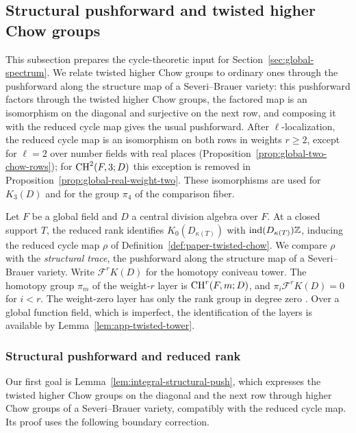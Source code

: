\subsection{Structural pushforward and twisted higher Chow groups}\label{sec:global-chow}
This subsection prepares the cycle-theoretic input for Section~\ref{sec:global-spectrum}.
We relate twisted higher Chow groups to ordinary ones through the pushforward along the structure map of a Severi--Brauer variety: this pushforward factors through the twisted higher Chow groups, the factored map is an isomorphism on the diagonal and surjective on the next row, and composing it with the reduced cycle map gives the usual pushforward.
After $\ell$-localization, the reduced cycle map is an isomorphism on both rows in weights $r\ge2$, except for $\ell=2$ over number fields with real places (Proposition~\ref{prop:global-two-chow-rows}); for $\operatorname{CH}^2(F,3;D)$ this exception is removed in Proposition~\ref{prop:global-real-weight-two}.
These isomorphisms are used for $K_3(D)$ and for the group $\pi_4$ of the comparison fiber.

Let $F$ be a global field and $D$ a central division algebra over $F$.
At a closed support $T$, the reduced rank identifies $K_0(D_{\kappa(T)})$ with $\operatorname{ind}(D_{\kappa(T)})\mathbb Z$, inducing the reduced cycle map $\rho$ of Definition~\ref{def:paper-twisted-chow}.
We compare $\rho$ with the \emph{structural trace}, the pushforward along the structure map of a Severi--Brauer variety.
Write $\mathcal F^rK(D)$ for the homotopy coniveau tower.
The homotopy group $\pi_m$ of the weight-$r$ layer is $\operatorname{CH}^r(F,m;D)$, and $\pi_i\mathcal F^rK(D)=0$ for $i<r$.
The weight-zero layer has only the rank group in degree zero \cite[Corollary 6.1.4 and Section 6.6]{KahnLevine2010}.
Over a global function field, which is imperfect, the identification of the layers is available by Lemma~\ref{lem:app-twisted-tower}.

\subsubsection{Structural pushforward and reduced rank}
Our first goal is Lemma~\ref{lem:integral-structural-push}, which expresses the twisted higher Chow groups on the diagonal and the next row through higher Chow groups of a Severi--Brauer variety, compatibly with the reduced cycle map.
Its proof uses the following boundary correction.

